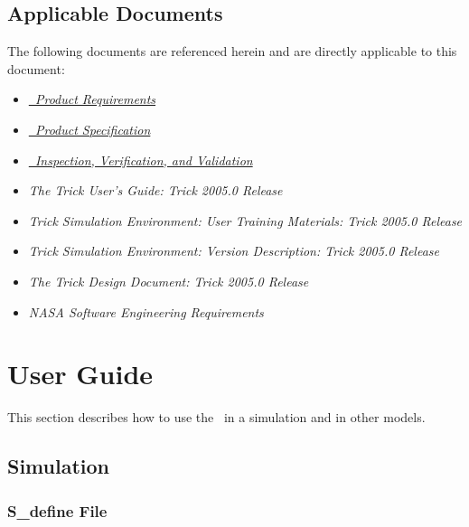 \documentclass[twoside,11pt,titlepage]{report}
\begin{document}
\section{Applicable Documents}
The following documents are referenced herein and are directly
applicable to this document:

\begin{itemize}
\item{\href{file:MODELReqt.pdf}
           {\em \MODEL\ Product Requirements}}
\cite{trickhlaenv:MODELReqt}

\item{\href{file:MODELSpec.pdf}
           {\em \MODEL\ Product Specification}}
\cite{trickhlaenv:MODELSpec}

\item{\href{file:MODELIVV.pdf}
           {\em \MODEL\ Inspection, Verification, and Validation}}
\cite{trickhlaenv:MODELIVV}

\item{\em The Trick User's Guide: Trick 2005.0 Release}
\cite{Vetter:TrickUser}

\item{\em Trick Simulation Environment: User Training Materials:
          Trick 2005.0 Release}
\cite{Vetter:TrickUTM}

\item{\em Trick Simulation Environment: Version Description:
          Trick 2005.0 Release}
\cite{Vetter:TrickVD}

\item{\em The Trick Design Document: Trick 2005.0 Release}
\cite{Vetter:TrickDD}

\item{\em NASA Software Engineering Requirements}
\cite{NASA:SWE}

\end{itemize}

\chapter{User Guide}\label{sec:guide}
This section describes how to use the
\MODEL\ in a simulation and in other models.

\section{Simulation}

\subsection{S\_define File}
\end{document}
